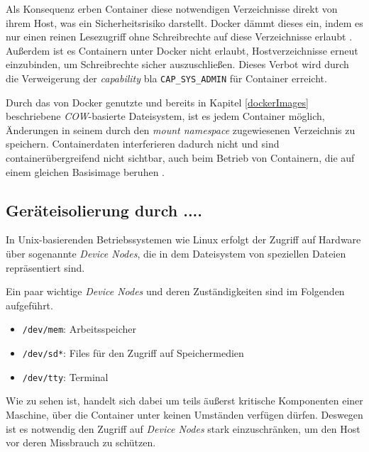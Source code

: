 \documentclass[../main.tex]{subfiles}
\begin{document}
			Als Konsequenz erben Container diese notwendigen Verzeichnisse direkt von ihrem Host, was ein Sicherheitsrisiko darstellt. Docker dämmt dieses ein, indem es nur einen reinen Lesezugriff ohne Schreibrechte auf diese Verzeichnisse erlaubt \cite[S.4]{dockerSecIntro}. Außerdem ist es Containern unter Docker nicht erlaubt, Hostverzeichnisse erneut einzubinden, um Schreibrechte sicher auszuschließen. Dieses Verbot wird durch die Verweigerung der \emph{capability} bla \texttt{CAP\_SYS\_ADMIN} für Container erreicht.

			Durch das von Docker genutzte und bereits in Kapitel \ref{dockerImages} beschriebene \emph{\acrshort{COW}}-basierte Dateisystem, ist es jedem Container möglich, Änderungen in seinem durch den \emph{mount namespace} zugewiesenen Verzeichnis zu speichern. Containerdaten interferieren dadurch nicht und sind containerübergreifend nicht sichtbar, auch beim Betrieb von Containern, die auf einem gleichen Basisimage beruhen \cite[S.4]{dockerSecIntro}.


			\cite[S.4]{dockerSec1}

    \subsection{Geräteisolierung durch ....}
			In Unix-basierenden Betriebssystemen wie Linux erfolgt der Zugriff auf Hardware über sogenannte \emph{Device Nodes}, die in dem Dateisystem von speziellen Dateien repräsentiert sind.

			Ein paar wichtige \emph{Device Nodes} und deren Zuständigkeiten sind im Folgenden aufgeführt.

			\begin{itemize}
				\item \texttt{/dev/mem}: Arbeitsspeicher
				\item \texttt{/dev/sd*}: Files für den Zugriff auf Speichermedien
				\item \texttt{/dev/tty}: Terminal
			\end{itemize}

			Wie zu sehen ist, handelt sich dabei um teils äußerst kritische Komponenten einer Maschine, über die Container unter keinen Umständen verfügen dürfen. Deswegen ist es notwendig den Zugriff auf \emph{Device Nodes} stark einzuschränken, um den Host vor deren Missbrauch zu schützen.
\end{document}
